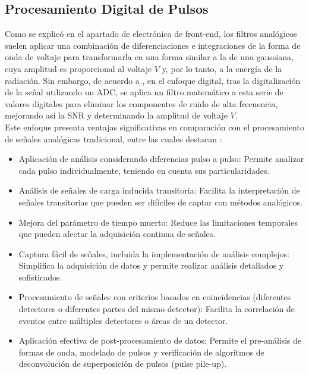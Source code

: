 \documentclass[]{book}
\begin{document}
\subsection{Procesamiento Digital de Pulsos}
 
\noindent Como se explicó en el apartado de electrónica de front-end, los filtros analógicos suelen aplicar una combinación de diferenciaciones e integraciones de la forma de onda de voltaje para transformarla en una forma similar a la de una gaussiana, cuya amplitud es proporcional al voltaje $V$ y, por lo tanto, a la energía de la radiación. Sin embargo, de acuerdo a \cite{loudenuclearspectroscopy}, en el enfoque digital, tras la digitalización de la señal utilizando un ADC, se aplica un filtro matemático a esta serie de valores digitales para eliminar los componentes de ruido de alta frecuencia, mejorando así la SNR y determinando la amplitud de voltaje $V$.\\

\noindent Este enfoque presenta ventajas significativas en comparación con el procesamiento de señales analógicas tradicional, entre las cuales destacan \cite{radeka1968optimum}:

\begin{itemize}
    \item Aplicación de análisis considerando diferencias pulso a pulso: Permite analizar cada pulso individualmente, teniendo en cuenta sus particularidades.
    \item Análisis de señales de carga inducida transitoria: Facilita la interpretación de señales transitorias que pueden ser difíciles de captar con métodos analógicos.
    \item  Mejora del parámetro de tiempo muerto: Reduce las limitaciones temporales que pueden afectar la adquisición continua de señales.
    \item Captura fácil de señales, incluida la implementación de análisis complejos: Simplifica la adquisición de datos y permite realizar análisis detallados y sofisticados.
    \item Procesamiento de señales con criterios basados en coincidencias (diferentes detectores o diferentes partes del mismo detector): Facilita la correlación de eventos entre múltiples detectores o áreas de un detector.
    \item Aplicación efectiva de post-procesamiento de datos: Permite el pre-análisis de formas de onda, modelado de pulsos y verificación de algoritmos de deconvolución de superposición de pulsos (pulse pile-up).

\end{itemize}
\end{document}
